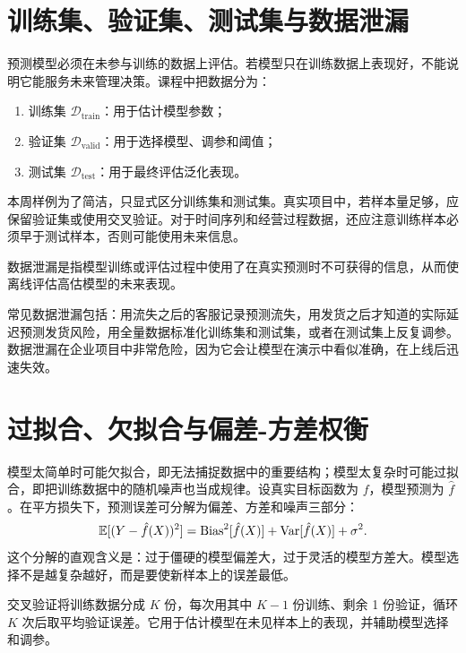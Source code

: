 \documentclass[UTF8,fontset=fandol,openany,zihao=-4]{ctexbook}
\begin{document}
\section{训练集、验证集、测试集与数据泄漏}

预测模型必须在未参与训练的数据上评估。若模型只在训练数据上表现好，不能说明它能服务未来管理决策。课程中把数据分为：
\begin{enumerate}
  \item 训练集 \(\mathcal D_{\mathrm{train}}\)：用于估计模型参数；
  \item 验证集 \(\mathcal D_{\mathrm{valid}}\)：用于选择模型、调参和阈值；
  \item 测试集 \(\mathcal D_{\mathrm{test}}\)：用于最终评估泛化表现。
\end{enumerate}

本周样例为了简洁，只显式区分训练集和测试集。真实项目中，若样本量足够，应保留验证集或使用交叉验证。对于时间序列和经营过程数据，还应注意训练样本必须早于测试样本，否则可能使用未来信息。

\begin{definition}[数据泄漏]
数据泄漏是指模型训练或评估过程中使用了在真实预测时不可获得的信息，从而使离线评估高估模型的未来表现。
\end{definition}

常见数据泄漏包括：用流失之后的客服记录预测流失，用发货之后才知道的实际延迟预测发货风险，用全量数据标准化训练集和测试集，或者在测试集上反复调参。数据泄漏在企业项目中非常危险，因为它会让模型在演示中看似准确，在上线后迅速失效。

\section{过拟合、欠拟合与偏差-方差权衡}

模型太简单时可能欠拟合，即无法捕捉数据中的重要结构；模型太复杂时可能过拟合，即把训练数据中的随机噪声也当成规律。设真实目标函数为 \(f\)，模型预测为 \(\hat f\)。在平方损失下，预测误差可分解为偏差、方差和噪声三部分：
\[
  \mathbb E[(Y-\hat f(X))^2]
  =
  \operatorname{Bias}^2[\hat f(X)]
  +
  \operatorname{Var}[\hat f(X)]
  +
  \sigma^2.
\]
这个分解的直观含义是：过于僵硬的模型偏差大，过于灵活的模型方差大。模型选择不是越复杂越好，而是要使新样本上的误差最低。

\begin{definition}[交叉验证]
交叉验证将训练数据分成 \(K\) 份，每次用其中 \(K-1\) 份训练、剩余 1 份验证，循环 \(K\) 次后取平均验证误差。它用于估计模型在未见样本上的表现，并辅助模型选择和调参。
\end{definition}
\end{document}

